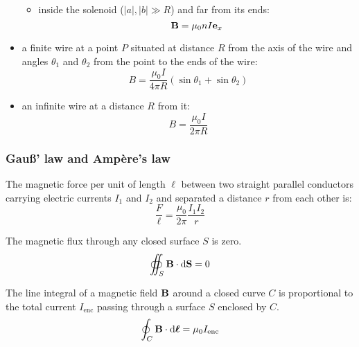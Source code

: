 \documentclass[../../../main.tex]{subfiles}
\begin{document}
\begin{multicols}{2}
\begin{prop}
\begin{itemize}
\begin{itemize}
\begin{center}
                      \begin{minipage}{\linewidth}
                        \centering
                        
                      \end{minipage}
                    \end{center}
              \item inside the solenoid ($|a|,|b|\gg R$) and far from its ends: $$\boldsymbol{\mathrm{B}}=\mu_0 nI\boldsymbol{\mathrm{e}}_x$$
            \end{itemize}
      \item a finite wire at a point $P$ situated at distance $R$ from the axis of the wire and angles $\theta_1$ and $\theta_2$ from the point to the ends of the wire: $$B=\frac{\mu_0I}{4\pi R}(\sin\theta_1+\sin\theta_2)$$
            \begin{center}
              \begin{minipage}{\linewidth}
                \centering
                
              \end{minipage}
            \end{center}
      \item an infinite wire at a distance $R$ from it: $$B=\frac{\mu_0I}{2\pi R}$$
    \end{itemize}
  \end{prop}
  \subsubsection{Gau\ss' law and Ampère's law}
  \begin{prop}
    The magnetic force per unit of length $\ell$ between two straight parallel conductors carrying electric currents $I_1$ and $I_2$ and separated a distance $r$ from each other is: $$\frac{F}{\ell}=\frac{\mu_0}{2\pi}\frac{I_1I_2}{r}$$
  \end{prop}
  \begin{law}
    The magnetic flux through any closed surface $S$ is zero.
    $$\oiint_S\boldsymbol{\mathrm{B}}\cdot\dd\boldsymbol{\mathrm{S}}=0$$
  \end{law}
  \begin{law}
    The line integral of a magnetic field $\boldsymbol{\mathrm{B}}$ around a closed curve $C$ is proportional to the total current $I_\text{enc}$ passing through a surface $S$ enclosed by $C$.
    $$\oint_C\boldsymbol{\mathrm{B}}\cdot\dd\vb*{\ell}=\mu_0I_\text{enc}$$
  \end{law}

\end{multicols}
\end{document}
